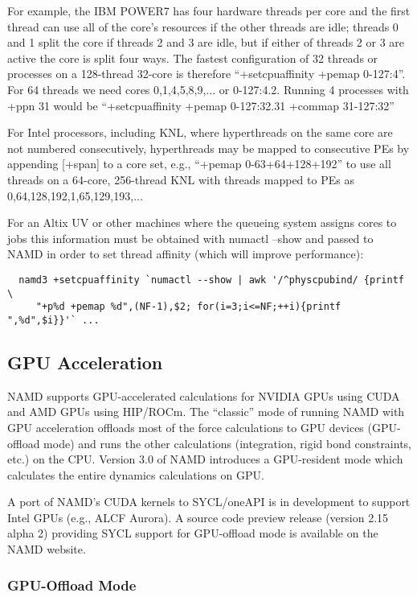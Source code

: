 For example, the IBM POWER7 has four hardware threads per core and the
first thread can use all of the core's resources if the other threads are
idle; threads 0 and 1 split the core if threads 2 and 3 are idle, but
if either of threads 2 or 3 are active the core is split four ways.  The
fastest configuration of 32 threads or processes on a 128-thread 32-core
is therefore ``+setcpuaffinity +pemap 0-127:4''.  For 64 threads we need
cores 0,1,4,5,8,9,... or 0-127:4.2.  Running 4 processes with +ppn 31
would be ``+setcpuaffinity +pemap 0-127:32.31 +commap 31-127:32''

For Intel processors, including KNL, where hyperthreads on the same core
are not numbered consecutively, hyperthreads may be mapped to consecutive
PEs by appending [+span] to a core set, e.g., ``+pemap 0-63+64+128+192''
to use all threads on a 64-core, 256-thread KNL with threads mapped to
PEs as 0,64,128,192,1,65,129,193,...

For an Altix UV or other machines where the queueing system assigns cores
to jobs this information must be obtained with numactl --show and passed
to NAMD in order to set thread affinity (which will improve performance):

\begin{verbatim}
  namd3 +setcpuaffinity `numactl --show | awk '/^physcpubind/ {printf \
     "+p%d +pemap %d",(NF-1),$2; for(i=3;i<=NF;++i){printf ",%d",$i}}'` ...
\end{verbatim}

\subsection{GPU Acceleration}

NAMD supports GPU-accelerated calculations for
NVIDIA GPUs using CUDA and AMD GPUs using HIP/ROCm.
The ``classic'' mode of running NAMD with GPU acceleration
offloads most of the force calculations to GPU devices
(GPU-offload mode) and runs the other calculations
(integration, rigid bond constraints, etc.) on the CPU.
Version 3.0 of NAMD introduces a GPU-resident mode
which calculates the entire dynamics calculations on GPU.

A port of NAMD's CUDA kernels to SYCL/oneAPI is in development
to support Intel GPUs (e.g., ALCF Aurora). A source code preview
release (version 2.15 alpha 2) providing SYCL support for
GPU-offload mode is available on the NAMD website.


\subsubsection{GPU-Offload Mode}

